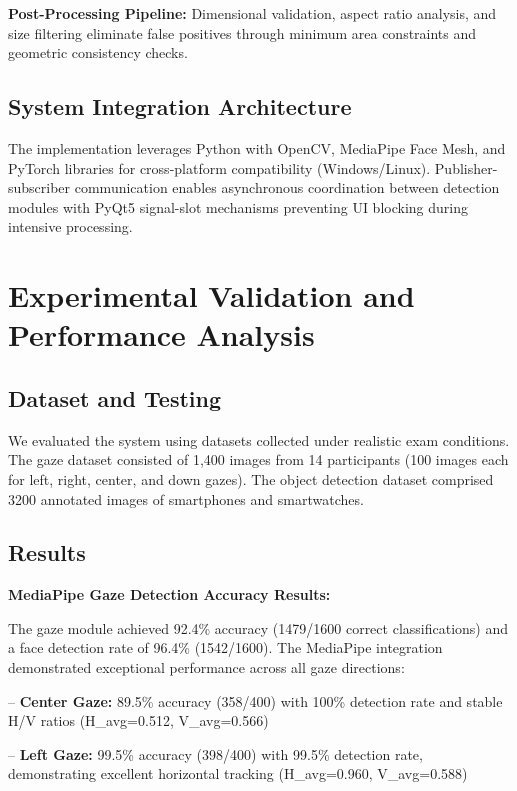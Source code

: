 \documentclass[conference]{IEEEtran}
\begin{document}
\textbf{Post-Processing Pipeline:} Dimensional validation, aspect ratio analysis, and 
size filtering eliminate false positives through minimum area constraints and geometric 
consistency checks.

\subsection{System Integration Architecture}

The implementation leverages Python with OpenCV, MediaPipe Face Mesh, and PyTorch 
libraries for cross-platform compatibility (Windows/Linux). Publisher-subscriber 
communication enables asynchronous coordination between detection modules with PyQt5 
signal-slot mechanisms preventing UI blocking during intensive processing.

\section{Experimental Validation and Performance Analysis}

\subsection{Dataset and Testing}
We evaluated the system using datasets collected under realistic exam conditions. 
The gaze dataset consisted of 1,400 images from 14 participants (100 images each 
for left, right, center, and down gazes). The object detection dataset comprised 
3200 annotated images of smartphones and smartwatches.

\subsection{Results}
\textbf{MediaPipe Gaze Detection Accuracy Results:}

The gaze module achieved 92.4\% accuracy (1479/1600 correct classifications) 
and a face detection rate of 96.4\% (1542/1600). The MediaPipe integration demonstrated 
exceptional performance across all gaze directions\cite{jakhete2024comprehensive,frontiersgaze2024,akinyelu2021}:

-- \textbf{Center Gaze:} 89.5\% accuracy (358/400) with 100\% detection rate and stable H/V ratios (H\_avg=0.512, V\_avg=0.566)

-- \textbf{Left Gaze:} 99.5\% accuracy (398/400) with 99.5\% detection rate, demonstrating excellent horizontal tracking (H\_avg=0.960, V\_avg=0.588)
\end{document}
